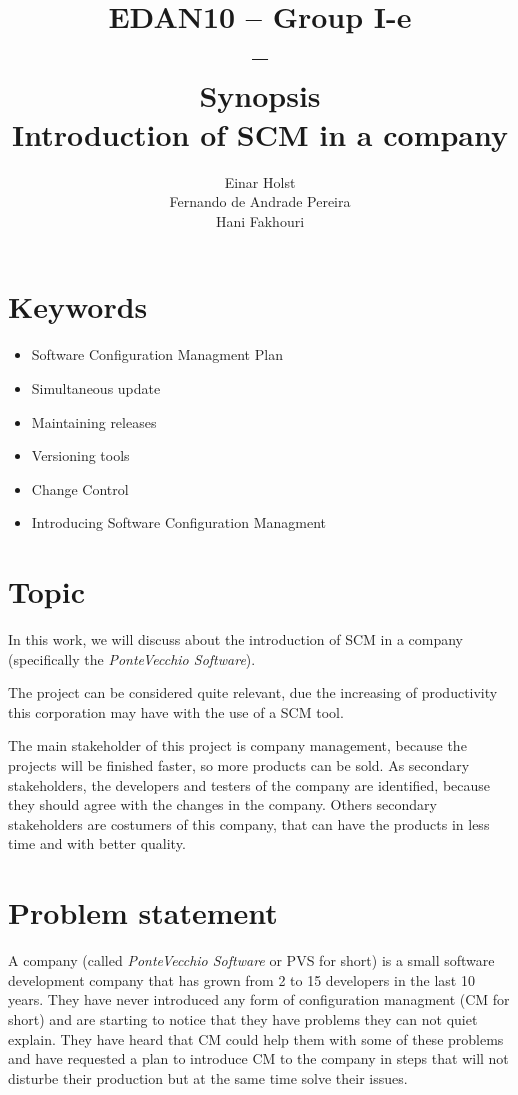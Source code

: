 \documentclass[a4paper]{article}
\title{EDAN10 -- Group I-e\\--\\ Synopsis \\
Introduction of SCM in a company 
}
\author{Einar Holst \\
Fernando de Andrade Pereira \\
Hani Fakhouri
}
\begin{document}
\maketitle
\thispagestyle{empty}
\clearpage

\tableofcontents
\thispagestyle{empty}
\clearpage

\setcounter{page}{1}

\section{Keywords}
\begin{itemize}
\item Software Configuration Managment Plan
\item Simultaneous update
\item Maintaining releases
\item Versioning tools
\item Change Control
\item Introducing Software Configuration Managment
\end{itemize}


\section{Topic}
In this work, we will discuss about the introduction of SCM in a company (specifically the \emph{PonteVecchio Software}).

The project can be considered quite relevant, due the increasing of productivity this corporation may have with the use of a SCM tool.

The main stakeholder of this project is company management, because the projects will be finished faster, so more products can be sold. 
As secondary stakeholders, the developers and testers of the company are identified, because they should agree with the changes in the company.
Others secondary stakeholders are costumers of this company, that can have the products in less time and with better quality.

\section{Problem statement}
A company (called \emph{PonteVecchio Software} or PVS for short) is a small software development company that has grown from 2 to 15 developers in the last 10 years. They have never introduced any form of configuration managment (CM for short) and are starting to notice that they have problems they can not quiet explain. They have heard that CM could help them with some of these problems and have requested a plan to introduce CM to the company in steps that will not disturbe their production but at the same time solve their issues.
\end{document}
